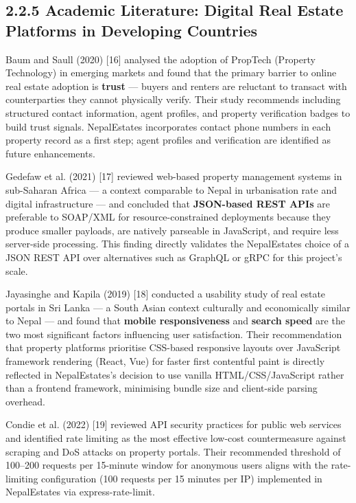 \documentclass[12pt,a4paper]{report}
\begin{document}
\subsection{2.2.5 Academic Literature: Digital Real Estate Platforms in Developing Countries}
Baum and Saull (2020) [16] analysed the adoption of PropTech (Property Technology) in emerging markets and found that the primary barrier to online real estate adoption is \textbf{trust} --- buyers and renters are reluctant to transact with counterparties they cannot physically verify. Their study recommends including structured contact information, agent profiles, and property verification badges to build trust signals. NepalEstates incorporates contact phone numbers in each property record as a first step; agent profiles and verification are identified as future enhancements.

Gedefaw et al. (2021) [17] reviewed web-based property management systems in sub-Saharan Africa --- a context comparable to Nepal in urbanisation rate and digital infrastructure --- and concluded that \textbf{JSON-based REST APIs} are preferable to SOAP/XML for resource-constrained deployments because they produce smaller payloads, are natively parseable in JavaScript, and require less server-side processing. This finding directly validates the NepalEstates choice of a JSON REST API over alternatives such as GraphQL or gRPC for this project's scale.

Jayasinghe and Kapila (2019) [18] conducted a usability study of real estate portals in Sri Lanka --- a South Asian context culturally and economically similar to Nepal --- and found that \textbf{mobile responsiveness} and \textbf{search speed} are the two most significant factors influencing user satisfaction. Their recommendation that property platforms prioritise CSS-based responsive layouts over JavaScript framework rendering (React, Vue) for faster first contentful paint is directly reflected in NepalEstates's decision to use vanilla HTML/CSS/JavaScript rather than a frontend framework, minimising bundle size and client-side parsing overhead.

Condie et al. (2022) [19] reviewed API security practices for public web services and identified rate limiting as the most effective low-cost countermeasure against scraping and DoS attacks on property portals. Their recommended threshold of 100--200 requests per 15-minute window for anonymous users aligns with the rate-limiting configuration (100 requests per 15 minutes per IP) implemented in NepalEstates via express-rate-limit.
\end{document}
